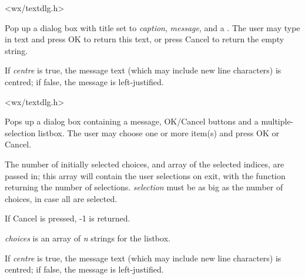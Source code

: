 
<wx/textdlg.h>


\label{wxgettextfromuser}


Pop up a dialog box with title set to {\it caption}, {\it message}, and a
.  The user may type in text and press OK to return this text,
or press Cancel to return the empty string.

If {\it centre} is true, the message text (which may include new line characters)
is centred; if false, the message is left-justified.


<wx/textdlg.h>


\label{wxgetmultiplechoice}


Pops up a dialog box containing a message, OK/Cancel buttons and a multiple-selection
listbox. The user may choose one or more item(s) and press OK or Cancel.

The number of initially selected choices, and array of the selected indices,
are passed in; this array will contain the user selections on exit, with
the function returning the number of selections. {\it selection} must be
as big as the number of choices, in case all are selected.

If Cancel is pressed, -1 is returned.

{\it choices} is an array of {\it n} strings for the listbox.

If {\it centre} is true, the message text (which may include new line characters)
is centred; if false, the message is left-justified.

